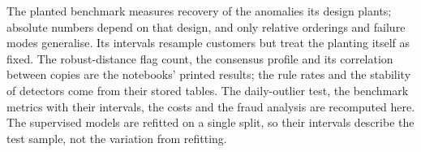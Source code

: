 The planted benchmark measures recovery of the anomalies its design plants; absolute numbers depend on that design, and
only relative orderings and failure modes generalise. Its intervals resample customers but treat the planting itself as
fixed. The robust-distance flag count, the consensus profile and its correlation between copies are the notebooks'
printed results; the rule rates and the stability of detectors come from their stored tables. The daily-outlier test,
the benchmark metrics with their intervals, the costs and the fraud analysis are recomputed here. The supervised models
are refitted on a single split, so their intervals describe the test sample, not the variation from refitting.
